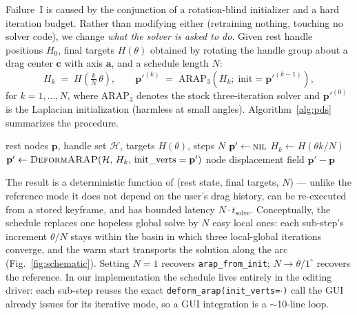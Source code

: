 \documentclass[10pt,twocolumn]{article}
\newcommand{\fromInit}{\texttt{arap\_from\_init}}
\begin{document}
Failure~I is caused by the conjunction of a rotation-blind initializer and a
hard iteration budget. Rather than modifying either (retraining nothing,
touching no solver code), we change \emph{what the solver is asked to do}.
Given rest handle positions $H_0$, final targets $H(\theta)$ obtained by
rotating the handle group about a drag center $\mathbf{c}$ with axis
$\mathbf{a}$, and a schedule length $N$:
\begin{equation}
  H_k \;=\; H\!\left(\tfrac{k}{N}\,\theta\right),\qquad
  \mathbf{p}'^{(k)} \;=\; \mathrm{ARAP}_3\!\left(H_k;\;
  \mathrm{init} = \mathbf{p}'^{(k-1)}\right),
  \label{eq:schedule}
\end{equation}
for $k = 1,\dots,N$, where $\mathrm{ARAP}_3$ denotes the stock three-iteration
solver and $\mathbf{p}'^{(0)}$ is the Laplacian initialization (harmless at
small angles). Algorithm~\ref{alg:pds} summarizes the procedure.

\begin{algorithm}[t]
\caption{Progressive Drag Scheduling}
\label{alg:pds}
\begin{algorithmic}[1]
\Require rest nodes $\mathbf{p}$, handle set $\mathcal{H}$, targets $H(\theta)$, steps $N$
\State $\mathbf{p}' \gets \textsc{nil}$ 
  \State $H_k \gets H(\theta k / N)$ 
  \State $\mathbf{p}' \gets \Call{DeformARAP}{\mathcal{H},\, H_k,\, \mathrm{init\_verts}=\mathbf{p}'}$
\EndFor
\State \Return node displacement field $\mathbf{p}' - \mathbf{p}$
\end{algorithmic}
\end{algorithm}

The result is a deterministic function of (rest state, final targets, $N$) ---
unlike the reference mode it does not depend on the user's drag history, can be
re-executed from a stored keyframe, and has bounded latency $N \cdot
t_{\mathrm{solve}}$. Conceptually, the schedule replaces one hopeless global
solve by $N$ easy local ones: each sub-step's increment $\theta/N$ stays within
the basin in which three local-global iterations converge, and the warm start
transports the solution along the arc (Fig.~\ref{fig:schematic}). Setting
$N{=}1$ recovers \fromInit{}; $N \rightarrow \theta/1^\circ$ recovers the
reference. In our implementation the schedule lives entirely in the editing
driver: each sub-step reuses the exact \texttt{deform\_arap(init\_verts=$\cdot$)}
call the GUI already issues for its iterative mode, so a GUI integration is a
${\sim}$10-line loop.
\end{document}
